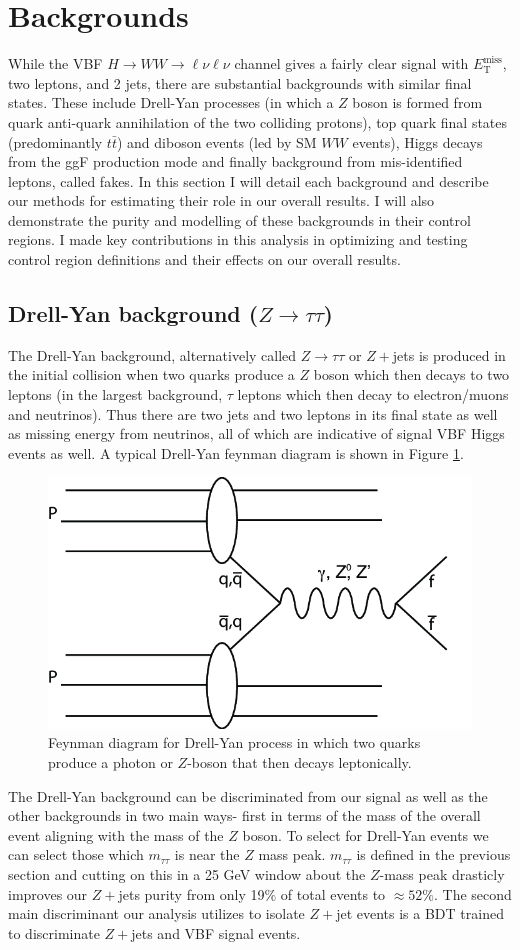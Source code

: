 \section{Backgrounds}
While the VBF $H\rightarrow WW\rightarrow \ell\nu\ell\nu$ channel gives a fairly clear signal with $E_{\text{T}}^{\text{miss}}$, two leptons, and 2 jets, there are substantial backgrounds with similar final states. These include Drell-Yan processes (in which a $Z$ boson is formed from quark  anti-quark annihilation of the two colliding protons), top quark final states (predominantly $t\bar{t}$) and diboson events (led by SM $WW$ events), Higgs decays from the ggF production mode and finally background from mis-identified leptons, called fakes. In this section I will detail each background and describe our methods for estimating their role in our overall results. I will also demonstrate the purity and modelling of these backgrounds in their control regions. I made key contributions in this analysis in optimizing and testing control region definitions and their effects on our overall results. 
\subsection{Drell-Yan background ($Z\rightarrow \tau\tau$)}
The Drell-Yan background, alternatively called $Z\rightarrow \tau\tau$ or $Z+$jets is produced in the initial collision when two quarks produce a $Z$ boson which then decays to two leptons (in the largest background, $\tau$ leptons which then decay to electron/muons and neutrinos).  Thus there are two jets and two leptons in its final state as well as missing energy from neutrinos, all of which are indicative of signal VBF Higgs events as well. A typical Drell-Yan feynman diagram is shown in Figure \ref{fig:DrellYan}. 
\begin{figure}
\centering
  \includegraphics[width=.5\linewidth]{Pictures/FeynmanDrellYan.png}
\caption{Feynman diagram for Drell-Yan process in which two quarks produce a photon or $Z$-boson that then decays leptonically.}
\label{fig:DrellYan}
\end{figure}
The Drell-Yan background can be discriminated from our signal as well as the other backgrounds in two main ways- first in terms of the mass of the overall event aligning with the mass of the $Z$ boson. To select for Drell-Yan events we can select those which $m_{\tau\tau}$ is near the $Z$ mass peak. $m_{\tau\tau}$ is defined in the previous section and cutting on this in a 25 GeV window about the $Z$-mass peak drasticly improves our $Z+$jets purity from only 19$\%$ of total events to $\approx52\%$. The second main discriminant our analysis utilizes to isolate $Z+$jet events is a BDT trained to discriminate $Z+$jets and VBF signal events.

